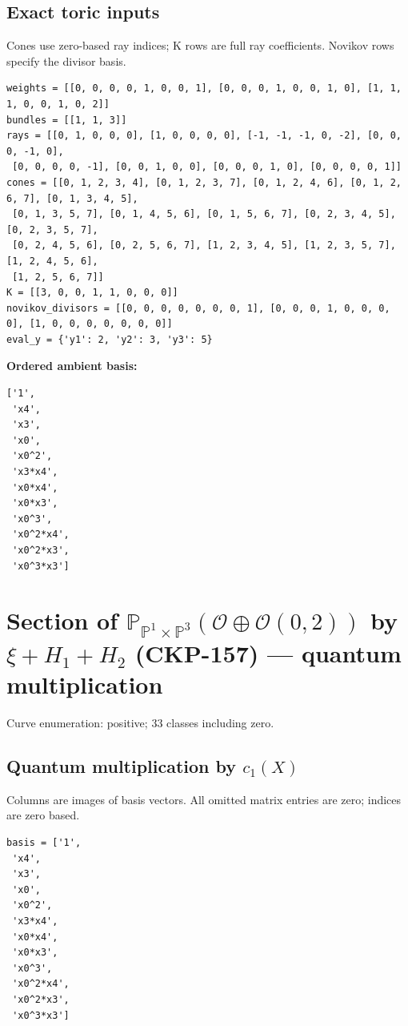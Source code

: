 \documentclass[10pt,a4paper]{article}
\begin{document}
\subsection*{Exact toric inputs}
Cones use zero-based ray indices; K rows are full ray coefficients. Novikov rows specify the divisor basis.

\begin{lstlisting}
weights = [[0, 0, 0, 0, 1, 0, 0, 1], [0, 0, 0, 1, 0, 0, 1, 0], [1, 1, 1, 0, 0, 1, 0, 2]]
bundles = [[1, 1, 3]]
rays = [[0, 1, 0, 0, 0], [1, 0, 0, 0, 0], [-1, -1, -1, 0, -2], [0, 0, 0, -1, 0],
 [0, 0, 0, 0, -1], [0, 0, 1, 0, 0], [0, 0, 0, 1, 0], [0, 0, 0, 0, 1]]
cones = [[0, 1, 2, 3, 4], [0, 1, 2, 3, 7], [0, 1, 2, 4, 6], [0, 1, 2, 6, 7], [0, 1, 3, 4, 5],
 [0, 1, 3, 5, 7], [0, 1, 4, 5, 6], [0, 1, 5, 6, 7], [0, 2, 3, 4, 5], [0, 2, 3, 5, 7],
 [0, 2, 4, 5, 6], [0, 2, 5, 6, 7], [1, 2, 3, 4, 5], [1, 2, 3, 5, 7], [1, 2, 4, 5, 6],
 [1, 2, 5, 6, 7]]
K = [[3, 0, 0, 1, 1, 0, 0, 0]]
novikov_divisors = [[0, 0, 0, 0, 0, 0, 0, 1], [0, 0, 0, 1, 0, 0, 0, 0], [1, 0, 0, 0, 0, 0, 0, 0]]
eval_y = {'y1': 2, 'y2': 3, 'y3': 5}
\end{lstlisting}

\textbf{Ordered ambient basis:}
\begin{lstlisting}
['1',
 'x4',
 'x3',
 'x0',
 'x0^2',
 'x3*x4',
 'x0*x4',
 'x0*x3',
 'x0^3',
 'x0^2*x4',
 'x0^2*x3',
 'x0^3*x3']
\end{lstlisting}

\clearpage\section*{Section of $\mathbb P_{\mathbb P^{1}\times \mathbb P^{3}}(\mathcal O\oplus \mathcal O(0,2))$ by $\xi +H_{1}+H_{2}$ (CKP-157) --- quantum multiplication}

Curve enumeration: positive; 33 classes including zero.
\subsection*{Quantum multiplication by $c_1(X)$}
Columns are images of basis vectors. All omitted matrix entries are zero; indices are zero based.

\begin{lstlisting}
basis = ['1',
 'x4',
 'x3',
 'x0',
 'x0^2',
 'x3*x4',
 'x0*x4',
 'x0*x3',
 'x0^3',
 'x0^2*x4',
 'x0^2*x3',
 'x0^3*x3']
\end{lstlisting}
\end{document}
